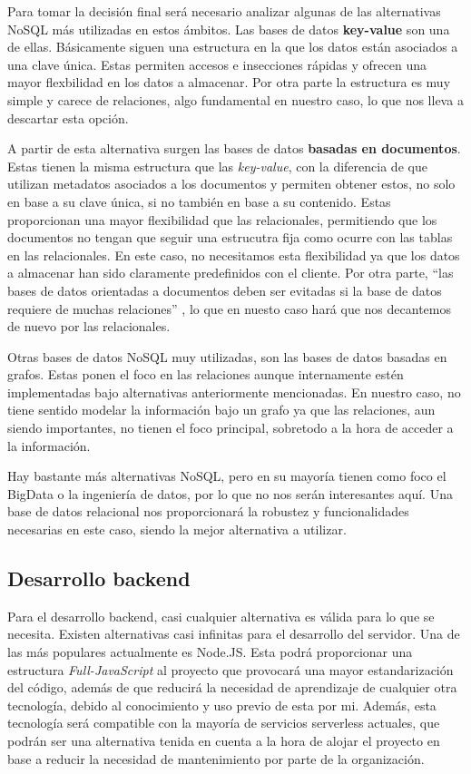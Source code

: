 Para tomar la decisión final será necesario analizar algunas de las alternativas NoSQL más utilizadas en estos ámbitos. Las bases de datos \textbf{key-value} son una de ellas. Básicamente siguen una estructura en la que los datos están asociados a una clave única. Estas permiten accesos e insecciones rápidas y ofrecen una mayor flexbilidad en los datos a almacenar. Por otra parte la estructura es muy simple y carece de relaciones, algo fundamental en nuestro caso, lo que nos lleva a descartar esta opción.

A partir de esta alternativa surgen las bases de datos \textbf{basadas en documentos}. Estas tienen la misma estructura que las \textit{key-value}, con la diferencia de que utilizan metadatos asociados a los documentos y permiten obtener estos, no solo en base a su clave única, si no también en base a su contenido. Estas proporcionan una mayor flexibilidad que las relacionales, permitiendo que los documentos no tengan que seguir una estrucutra fija como ocurre con las tablas en las relacionales. En este caso, no necesitamos esta flexibilidad ya que los datos a almacenar han sido claramente predefinidos con el cliente. Por otra parte, ``las bases de datos orientadas a documentos deben ser evitadas si la base de datos requiere de muchas relaciones'' \cite{NoSQLvsSQL_2}, lo que en nuesto caso hará que nos decantemos de nuevo por las relacionales.

Otras bases de datos NoSQL muy utilizadas, son las bases de datos basadas en grafos. Estas ponen el foco en las relaciones aunque internamente estén implementadas bajo alternativas anteriormente mencionadas. En nuestro caso, no tiene sentido modelar la información bajo un grafo ya que las relaciones, aun siendo importantes, no tienen el foco principal, sobretodo a la hora de acceder a la información.

Hay bastante más alternativas NoSQL, pero en su mayoría tienen como foco el BigData o la ingeniería de datos, por lo que no nos serán interesantes aquí. Una base de datos relacional nos proporcionará la robustez y funcionalidades necesarias en este caso, siendo la mejor alternativa a utilizar.

\subsection{Desarrollo backend}

Para el desarrollo backend, casi cualquier alternativa es válida para lo que se necesita. Existen alternativas casi infinitas para el desarrollo del servidor. Una de las más populares actualmente es Node.JS. Esta podrá proporcionar una estructura \textit{Full-JavaScript} al proyecto que provocará una mayor estandarización del código, además de que reducirá la necesidad de aprendizaje de cualquier otra tecnología, debido al conocimiento y uso previo de esta por mi. Además, esta tecnología será compatible con la mayoría de servicios serverless actuales, que podrán ser una alternativa tenida en cuenta a la hora de alojar el proyecto en base a reducir la necesidad de mantenimiento por parte de la organización. 